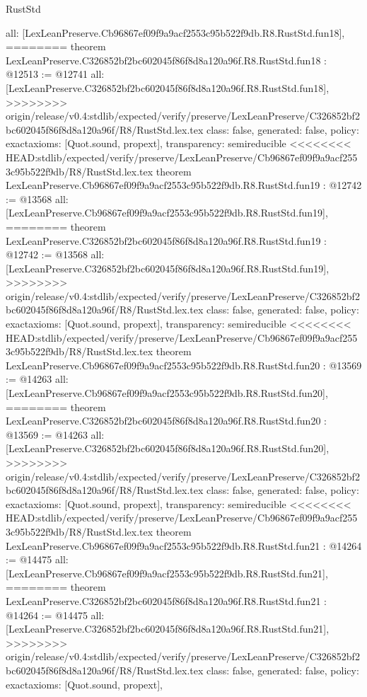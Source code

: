 \begin{lexlean}{RustStd}
\begin{coremodule}
{\begin{coremodule}
{{{{{{{{{{{{{{{{{{{{{  all: [LexLeanPreserve.Cb96867ef09f9a9acf2553c95b522f9db.R8.RustStd.fun18],
========
theorem LexLeanPreserve.C326852bf2bc602045f86f8d8a120a96f.R8.RustStd.fun18 : @12513 := @12741 {
  all: [LexLeanPreserve.C326852bf2bc602045f86f8d8a120a96f.R8.RustStd.fun18],
>>>>>>>> origin/release/v0.4:stdlib/expected/verify/preserve/LexLeanPreserve/C326852bf2bc602045f86f8d8a120a96f/R8/RustStd.lex.tex
  class: false,
  generated: false,
  policy: exact{axioms: [Quot.sound, propext]},
  transparency: semireducible
}
<<<<<<<< HEAD:stdlib/expected/verify/preserve/LexLeanPreserve/Cb96867ef09f9a9acf2553c95b522f9db/R8/RustStd.lex.tex
theorem LexLeanPreserve.Cb96867ef09f9a9acf2553c95b522f9db.R8.RustStd.fun19 : @12742 := @13568 {
  all: [LexLeanPreserve.Cb96867ef09f9a9acf2553c95b522f9db.R8.RustStd.fun19],
========
theorem LexLeanPreserve.C326852bf2bc602045f86f8d8a120a96f.R8.RustStd.fun19 : @12742 := @13568 {
  all: [LexLeanPreserve.C326852bf2bc602045f86f8d8a120a96f.R8.RustStd.fun19],
>>>>>>>> origin/release/v0.4:stdlib/expected/verify/preserve/LexLeanPreserve/C326852bf2bc602045f86f8d8a120a96f/R8/RustStd.lex.tex
  class: false,
  generated: false,
  policy: exact{axioms: [Quot.sound, propext]},
  transparency: semireducible
}
<<<<<<<< HEAD:stdlib/expected/verify/preserve/LexLeanPreserve/Cb96867ef09f9a9acf2553c95b522f9db/R8/RustStd.lex.tex
theorem LexLeanPreserve.Cb96867ef09f9a9acf2553c95b522f9db.R8.RustStd.fun20 : @13569 := @14263 {
  all: [LexLeanPreserve.Cb96867ef09f9a9acf2553c95b522f9db.R8.RustStd.fun20],
========
theorem LexLeanPreserve.C326852bf2bc602045f86f8d8a120a96f.R8.RustStd.fun20 : @13569 := @14263 {
  all: [LexLeanPreserve.C326852bf2bc602045f86f8d8a120a96f.R8.RustStd.fun20],
>>>>>>>> origin/release/v0.4:stdlib/expected/verify/preserve/LexLeanPreserve/C326852bf2bc602045f86f8d8a120a96f/R8/RustStd.lex.tex
  class: false,
  generated: false,
  policy: exact{axioms: [Quot.sound, propext]},
  transparency: semireducible
}
<<<<<<<< HEAD:stdlib/expected/verify/preserve/LexLeanPreserve/Cb96867ef09f9a9acf2553c95b522f9db/R8/RustStd.lex.tex
theorem LexLeanPreserve.Cb96867ef09f9a9acf2553c95b522f9db.R8.RustStd.fun21 : @14264 := @14475 {
  all: [LexLeanPreserve.Cb96867ef09f9a9acf2553c95b522f9db.R8.RustStd.fun21],
========
theorem LexLeanPreserve.C326852bf2bc602045f86f8d8a120a96f.R8.RustStd.fun21 : @14264 := @14475 {
  all: [LexLeanPreserve.C326852bf2bc602045f86f8d8a120a96f.R8.RustStd.fun21],
>>>>>>>> origin/release/v0.4:stdlib/expected/verify/preserve/LexLeanPreserve/C326852bf2bc602045f86f8d8a120a96f/R8/RustStd.lex.tex
  class: false,
  generated: false,
  policy: exact{axioms: [Quot.sound, propext]},
}}}}}}}}}}}}}}}}}}}}}}}}}
\end{coremodule}}
\end{coremodule}
\end{lexlean}
